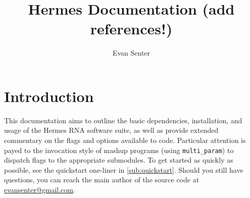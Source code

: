 \documentclass[11pt]{article}
\begin{document}
\newcommand{\sectionLabel}[2] {
  \section{#1}
  \label{sec:#2}
}
\newcommand{\subsectionLabel}[2] {
  \subsection{#1}
  \label{sub:#2}
}
\newcommand{\programDetails}[4] {
  \subsubsection{Applications}
  \label{subsub:#1app}
  #2
  \subsubsection{Example Usage}
  \label{subsub:#1ex}
  #3
  \subsubsection{Options}
  \label{subsub:#1opt}
  #4
}
\newcommand{\fixedWidthInList}[4] {
	\item[\texttt{#1} \textnormal{#2} \url{#3}] \hfill \\
	#4
}
\newcommand{\ttt}[1]{{\tt #1\xspace}}
\newcommand{\hermes}{\ttt{hermes}}
\newcommand{\multiParam}{\ttt{multi\_param}}
\newcommand{\fft}{\ttt{FFTbor2D}}
\newcommand{\rnamfpt}{\ttt{RNAmfpt}}
\newcommand{\rnaeq}{\ttt{RNAeq}}
\newcommand{\fftmfpt}{\ttt{FFTmfpt}}
\newcommand{\ffteq}{\ttt{FFTeq}}
\newcommand{\rateeq}{\ttt{RateEq}}

\title{Hermes Documentation (add references!)}
\author{Evan Senter}

\maketitle
\tableofcontents
\clearpage

\sectionLabel{Introduction}{intro}

This documentation aims to outline the basic dependencies, installation, and usage of the Hermes RNA software suite, as well as provide extended commentary on the flags and options available to code. Particular attention is payed to the invocation style of mashup programs (using \multiParam) to dispatch flags to the appropriate submodules. To get started as quickly as possible, see the quickstart one-liner in \ref{sub:quickstart}. Should you still have questions, you can reach the main author of the source code at \href{mailto:evansenter@gmail.com}{evansenter@gmail.com}.
\end{document}
